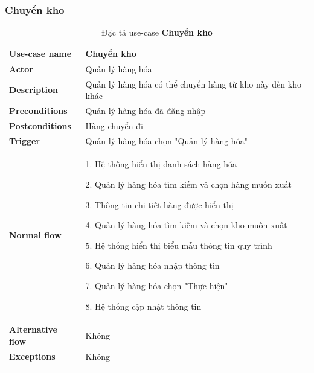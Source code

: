 \subsubsection{Chuyển kho}
{
    \setlength\extrarowheight{6pt}
    \begin{longtable}{| p{} | p{} |}
        \hline
        \textbf{Use-case name}
         &
        Chuyển kho
        \\
        \hline
        \textbf{Actor}
         &
        Quản lý hàng hóa
        \\
        \hline
        \textbf{Description}
         &
        Quản lý hàng hóa có thể chuyển hàng từ kho này đến kho khác
        \\
        \hline
        \textbf{Preconditions}
         &
        Quản lý hàng hóa đã đăng nhập
        \\
        \hline
        \textbf{Postconditions}
         &
        Hàng chuyển đi
        \\
        \hline
        \textbf{Trigger}
         &
        Quản lý hàng hóa chọn "Quản lý hàng hóa"
        \\
        \hline
        \begin{flushleft}
            \textbf{Normal flow}
        \end{flushleft}
         &
        1. Hệ thống hiển thị danh sách hàng hóa

        2. Quản lý hàng hóa tìm kiếm và chọn hàng muốn xuất

        3. Thông tin chi tiết hàng được hiển thị

        4. Quản lý hàng hóa tìm kiếm và chọn kho muốn xuất

        5. Hệ thống hiển thị biểu mẫu thông tin quy trình

        6. Quản lý hàng hóa nhập thông tin

        7. Quản lý hàng hóa chọn "Thực hiện"

        8. Hệ thống cập nhật thông tin
        \\
        \hline
        \textbf{Alternative flow}
         &
        Không
        \\
        \hline
        \textbf{Exceptions}
         &
        Không
        \\
        \hline
        \caption{Đặc tả use-case \textbf{Chuyển kho}}
    \end{longtable}
}

